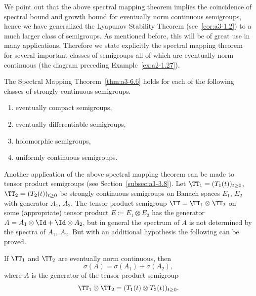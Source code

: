 We point out that the above spectral mapping theorem implies the coincidence of spectral bound and growth bound for eventually norm continuous semigroups, hence we have generalized the Lyapunov Stability Theorem (see~\ref{cor:a3-1.2}) to a much larger class of semigroups.
As mentioned before, this will be of great use in many applications.
Therefore we state explicitly the spectral mapping theorem for several important classes of semigroups all of which are eventually norm continuous (\cf the diagram preceding Example~\ref{ex:a2-1.27}).
\begin{corollary}\label{cor:a3-6.7}
The Spectral Mapping Theorem~\ref{thm:a3-6.6}
holds for each of the following classes of strongly continuous semigroups.
\begin{enumerate}[\upshape (i)]
\item 
eventually compact semigroups,

\item 
eventually differentiable semigroups,

\item 
holomorphic semigroups,

\item 
uniformly continuous semigroups.
\end{enumerate}
\end{corollary}
Another application of the above spectral mapping theorem can be made to tensor product semigroups (see Section~\ref{subsec:a1-3.8}).
Let $\TT_{1} = (T_{1}(t))_{t\geq 0}$, $\TT_{2} = (T_{2}(t))_{t\geq 0}$ be strongly continuous semigroups on Banach spaces $E_{1}$, $E_{2}$ with generator $A_{1}$, $A_{2}$.
The tensor product semigroup $\TT = \TT_{1} \otimes \TT_{2}$ on some (appropriate) tensor product $E \coloneq E_{1} \otimes E_{2}$ has the generator $A = A_{1}\otimes\Id + \Id\otimes A_{2}$, but in general the spectrum of\/ $A$ is not determined by the spectra of\/ $A_{1}$, $A_{2}$.
But with an additional hypothesis the following can be proved.
%
\begin{corollary}\label{cor:a3-6.8}
If\/ $\TT_{1}$ and $\TT_{2}$ are eventually norm continuous, then
\[
	\sigma(A) = \sigma(A_{1}) + \sigma(A_{2}) ,
\]
where $A$ is the generator of the tensor product semigroup
\[
	\TT_{1} \otimes \TT_{2} = (T_{1}(t) \otimes T_{2}(t))_{t\geq 0} .
\]
\end{corollary}
